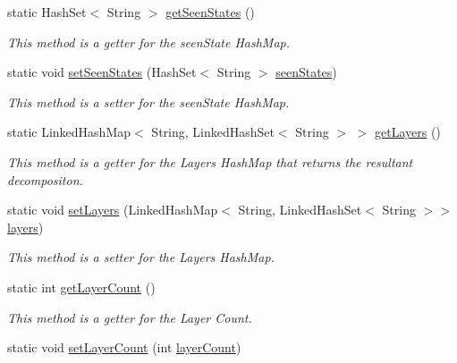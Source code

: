 \begin{DoxyCompactItemize}
\item 
static Hash\+Set$<$ String $>$ \hyperlink{classese_1_1seas_1_1upenn_1_1edu_1_1_planar_separator_a54e7709f8e3ce93f4ab73711ed5d6c44}{get\+Seen\+States} ()
\begin{DoxyCompactList}\small\item\em This method is a getter for the seen\+State Hash\+Map. \end{DoxyCompactList}\item 
static void \hyperlink{classese_1_1seas_1_1upenn_1_1edu_1_1_planar_separator_af92505f765082aa8bb7cbd2e77d5ef29}{set\+Seen\+States} (Hash\+Set$<$ String $>$ \hyperlink{classese_1_1seas_1_1upenn_1_1edu_1_1_planar_separator_a5c89ea3190aa6feb4ba3205ee17d095d}{seen\+States})
\begin{DoxyCompactList}\small\item\em This method is a setter for the seen\+State Hash\+Map. \end{DoxyCompactList}\item 
static Linked\+Hash\+Map$<$ String, Linked\+Hash\+Set$<$ String $>$ $>$ \hyperlink{classese_1_1seas_1_1upenn_1_1edu_1_1_planar_separator_a431b40bb673f68e12c58b018e80a07ef}{get\+Layers} ()
\begin{DoxyCompactList}\small\item\em This method is a getter for the Layers Hash\+Map that returns the resultant decompositon. \end{DoxyCompactList}\item 
static void \hyperlink{classese_1_1seas_1_1upenn_1_1edu_1_1_planar_separator_a4cfee899eb14ed85e85ac4005613f343}{set\+Layers} (Linked\+Hash\+Map$<$ String, Linked\+Hash\+Set$<$ String $>$$>$ \hyperlink{classese_1_1seas_1_1upenn_1_1edu_1_1_planar_separator_a882cad4aa4f2724131bf01b09b34685c}{layers})
\begin{DoxyCompactList}\small\item\em This method is a setter for the Layers Hash\+Map. \end{DoxyCompactList}\item 
static int \hyperlink{classese_1_1seas_1_1upenn_1_1edu_1_1_planar_separator_a246f23da4501f0ad1219dfdc4e1233cd}{get\+Layer\+Count} ()
\begin{DoxyCompactList}\small\item\em This method is a getter for the Layer Count. \end{DoxyCompactList}\item 
static void \hyperlink{classese_1_1seas_1_1upenn_1_1edu_1_1_planar_separator_a3916f7362296694f146a4337591fc7df}{set\+Layer\+Count} (int \hyperlink{classese_1_1seas_1_1upenn_1_1edu_1_1_planar_separator_a67f579fe79d5301280c1abb4d8ce5116}{layer\+Count})
$$
\end{DoxyCompactItemize}
